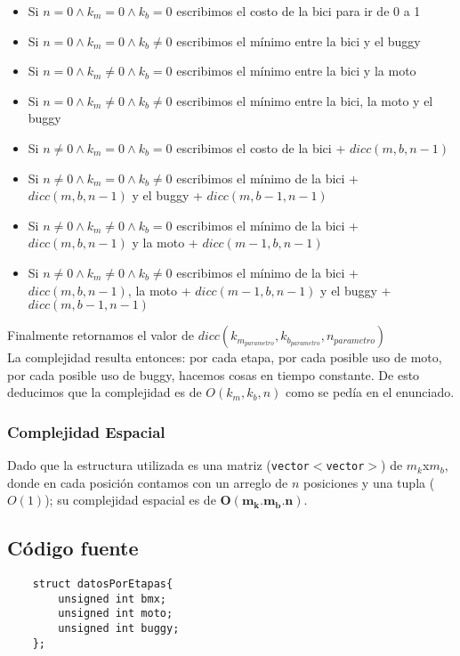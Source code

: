 \begin{itemize}
\item Si $n=0 \wedge k_m=0 \wedge k_b=0$ escribimos el costo de la bici para ir de 0 a 1
\item Si $n=0 \wedge k_m=0 \wedge k_b\neq0$ escribimos el m\'inimo entre la bici y el buggy
\item Si $n=0 \wedge k_m\neq0 \wedge k_b=0$ escribimos el m\'inimo entre la bici y la moto
\item Si $n=0 \wedge k_m\neq0 \wedge k_b\neq0$ escribimos el m\'inimo entre la bici, la moto y el buggy
\item Si $n\neq0 \wedge k_m=0 \wedge k_b=0$ escribimos el costo de la bici + $dicc(m, b, n-1)$
\item Si $n\neq0 \wedge k_m=0 \wedge k_b\neq0$ escribimos el m\'inimo de la bici + $dicc(m, b, n-1)$ y el buggy + $dicc(m, b-1, n-1)$
\item Si $n\neq0 \wedge k_m\neq0 \wedge k_b=0$ escribimos el m\'inimo de la bici + $dicc(m, b, n-1)$ y la moto + $dicc(m-1, b, n-1)$
\item Si $n\neq0 \wedge k_m\neq0 \wedge k_b\neq0$ escribimos el m\'inimo de la bici + $dicc(m, b, n-1)$, la moto + $dicc(m-1, b, n-1)$ y el buggy + $dicc(m, b-1, n-1)$
\end{itemize}

Finalmente retornamos el valor de $dicc(k_{m_{parametro}},k_{b_{parametro}},n_{parametro})$\\

La complejidad resulta entonces: por cada etapa, por cada posible uso de moto, por cada posible uso de buggy, hacemos cosas en tiempo constante. De esto deducimos que la complejidad es de $O(k_{m},k_{b},n)$ como se ped\'ia en el enunciado.

\subsubsection{Complejidad Espacial}
Dado que la estructura utilizada es una matriz (\texttt{vector$<$vector$>$}) de $m_k$x$m_b$, donde en cada posici\'on contamos con un arreglo de $n$ posiciones y una tupla ($O(1)$); su complejidad espacial es de $\mathbf{O(m_k.m_b.n)}$.

\newpage
\subsection{C\'odigo fuente}
	\begin{codesnippet}
	\begin{verbatim}
    struct datosPorEtapas{
        unsigned int bmx;
        unsigned int moto;
        unsigned int buggy;
    };
	\end{verbatim}
	\end{codesnippet}

